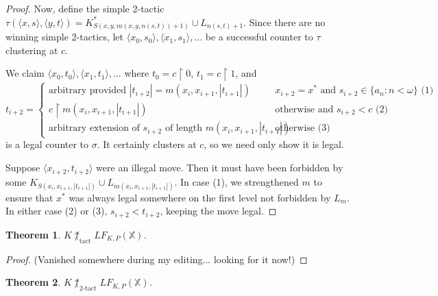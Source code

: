 \documentclass[11pt]{article}
\theoremstyle{plain}
\newtheorem{theorem}{Theorem}
\theoremstyle{definition}
\theoremstyle{remark}
\newcommand{\tactwin}{\uparrow_{\text{tact}}}
\newcommand{\ktactwin}[1]{\uparrow_{#1\text{-tact}}}
\newcommand{\lfkpgame}[1]{LF_{K,P}(#1)}
\newcommand{\<}{\langle}
\renewcommand{\>}{\rangle}
\newcommand{\rest}{\restriction}
\begin{document}
{\begin{proof}
Now, define the simple 2-tactic $\tau(\<x,s\>,\<y,t\>)=K^*_{S(x,y,m(x,y,n(s,t))+1)} \cup L_{n(s,t)+1}$. Since there are no winning simple 2-tactics, let $\<x_0,s_0\>,\<x_1,s_1\>,\dots$ be a successful counter to $\tau$ clustering at $c$.

We claim $\<x_0,t_0\>, \<x_1,t_1\>, \dots$ where $t_0=c\rest 0$, $t_1=c\rest 1$, and
$$
t_{i+2} = \left\{
\begin{array}{ll}
\text{arbitrary provided } |t_{i+2}| = m(x_i,x_{i+1},|t_{i+1}|) & x_{i+2}= x^* \text{ and } s_{i+2} \in \{a_n : n < \omega\} \text{ (1) } \\
c\rest m(x_i,x_{i+1},|t_{i+1}|) & \text{otherwise and } s_{i+2} < c  \text{ (2) }\\
\text{arbitrary extension of } s_{i+2} \text{ of length } m(x_i,x_{i+1},|t_{i+1}|) & \text{otherwise} \text{ (3) }
\end{array}
\right.
$$
is a legal counter to $\sigma$. It certainly clusters at $c$, so we need only show it is legal.

Suppose $\<x_{i+2}, t_{i+2}\>$ were an illegal move. Then it must have been forbidden by some $K_{S(x_i,x_{i+1},|t_{i+1}|)}\cup L_{m(x_i,x_{i+1},|t_{i+1}|)}$. In case (1), we strengthened $m$ to ensure that $x^*$ was always legal somewhere on the first level not forbidden by $L_m$. In either case (2) or (3), $s_{i+2}<t_{i+2}$, keeping the move legal.

\end{proof}
}


\begin{theorem}
$K\not\tactwin\lfkpgame{\mathbb{X}}$.
\end{theorem}

\begin{proof}
(Vanished somewhere during my editing... looking for it now!)
\end{proof}



\begin{theorem}
$K\not\ktactwin{2}\lfkpgame{\mathbb{X}}$.
\end{theorem}
\end{document}

